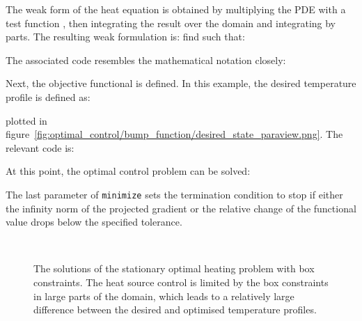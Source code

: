 \documentclass[prodmode,acmtoms]{acmsmall}
\begin{document}

The weak form of the heat equation is obtained by multiplying the PDE with a test function , then integrating the result over the domain and integrating by parts.
The resulting weak formulation is: find  such that: 

The associated code resembles the mathematical notation closely:


Next, the objective functional is defined. 
In this example, the desired temperature profile  is defined as:

plotted in figure~\ref{fig:optimal_control/bump_function/desired_state_paraview.png}. 
The relevant code is:


At this point, the optimal control problem can be solved: 


The last parameter of \texttt{minimize} sets the termination condition 
to stop if either the infinity norm of the projected gradient or the relative change of the functional value 
drops below the specified tolerance.

\begin{figure}[t]
\centering
        \\
        \caption{The solutions of the stationary optimal heating problem with box constraints. 
                 The heat source control is limited by the box constraints in large parts of the domain,
                  which leads to a relatively large difference between the desired and optimised temperature profiles.}\label{fig:solution_optimal_heating_problem}
\end{figure}
\end{document}
